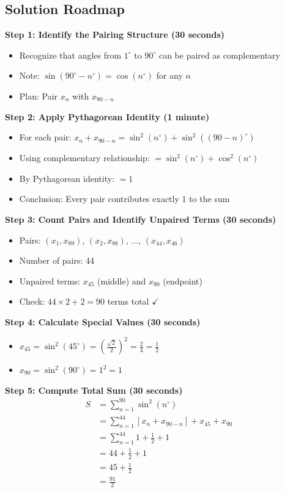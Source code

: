 \documentclass[12pt]{article}
\begin{document}
\begin{solutionbox}
\subsection*{Solution Roadmap}

\textbf{Step 1: Identify the Pairing Structure (30 seconds)}
\begin{itemize}
    \item Recognize that angles from $1^{\circ}$ to $90^{\circ}$ can be paired as complementary
    \item Note: $\sin(90^{\circ} - n^{\circ}) = \cos(n^{\circ})$ for any $n$
    \item Plan: Pair $x_n$ with $x_{90-n}$
\end{itemize}

\textbf{Step 2: Apply Pythagorean Identity (1 minute)}
\begin{itemize}
    \item For each pair: $x_n + x_{90-n} = \sin^2(n^{\circ}) + \sin^2((90-n)^{\circ})$
    \item Using complementary relationship: $= \sin^2(n^{\circ}) + \cos^2(n^{\circ})$
    \item By Pythagorean identity: $= 1$
    \item Conclusion: Every pair contributes exactly 1 to the sum
\end{itemize}

\textbf{Step 3: Count Pairs and Identify Unpaired Terms (30 seconds)}
\begin{itemize}
    \item Pairs: $(x_1, x_{89})$, $(x_2, x_{88})$, $\ldots$, $(x_{44}, x_{46})$
    \item Number of pairs: 44
    \item Unpaired terms: $x_{45}$ (middle) and $x_{90}$ (endpoint)
    \item Check: $44 \times 2 + 2 = 90$ terms total $\checkmark$
\end{itemize}

\textbf{Step 4: Calculate Special Values (30 seconds)}
\begin{itemize}
    \item $x_{45} = \sin^2(45^{\circ}) = \left(\frac{\sqrt{2}}{2}\right)^2 = \frac{2}{4} = \frac{1}{2}$
    \item $x_{90} = \sin^2(90^{\circ}) = 1^2 = 1$
\end{itemize}

\textbf{Step 5: Compute Total Sum (30 seconds)}
\begin{align*}
S &= \sum_{n=1}^{90} \sin^2(n^{\circ}) \\
&= \sum_{n=1}^{44} [x_n + x_{90-n}] + x_{45} + x_{90} \\
&= \sum_{n=1}^{44} 1 + \frac{1}{2} + 1 \\
&= 44 + \frac{1}{2} + 1 \\
&= 45 + \frac{1}{2} \\
&= \frac{91}{2}
\end{align*}


\end{solutionbox}
\end{document}
